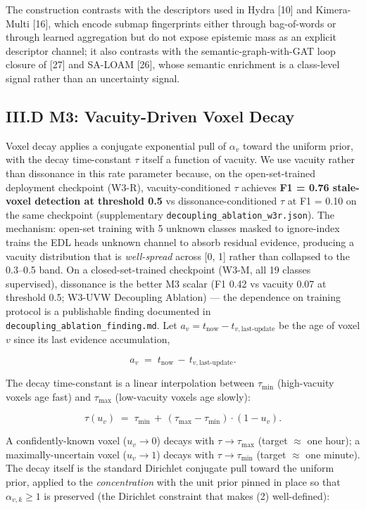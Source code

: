 \documentclass[
]{article}
\begin{document}
The construction contrasts with the descriptors used in Hydra {[}10{]}
and Kimera-Multi {[}16{]}, which encode submap fingerprints either
through bag-of-words or through learned aggregation but do not expose
epistemic mass as an explicit descriptor channel; it also contrasts with
the semantic-graph-with-GAT loop closure of {[}27{]} and SA-LOAM
{[}26{]}, whose semantic enrichment is a class-level signal rather than
an uncertainty signal.

\subsection{III.D M3: Vacuity-Driven Voxel
Decay}\label{iiid-m3-vacuity-driven-voxel-decay}

Voxel decay applies a conjugate exponential pull of \(\alpha_v\) toward
the uniform prior, with the decay time-constant \(\tau\) itself a
function of vacuity. We use vacuity rather than dissonance in this rate
parameter because, on the open-set-trained deployment checkpoint (W3-R),
vacuity-conditioned \(\tau\) achieves \textbf{F1 = 0.76 stale-voxel
detection at threshold 0.5} vs dissonance-conditioned \(\tau\) at F1 =
0.10 on the same checkpoint (supplementary
\texttt{decoupling\_ablation\_w3r.json}). The mechanism: open-set
training with 5 unknown classes masked to ignore-index trains the EDL
head\textquotesingle s unknown channel to absorb residual evidence,
producing a vacuity distribution that is \emph{well-spread} across {[}0,
1{]} rather than collapsed to the 0.3--0.5 band. On a closed-set-trained
checkpoint (W3-M, all 19 classes supervised), dissonance is the better
M3 scalar (F1 0.42 vs vacuity 0.07 at threshold 0.5; W3-UVW Decoupling
Ablation) --- the dependence on training protocol is a publishable
finding documented in \texttt{decoupling\_ablation\_finding.md}. Let
\(a_v = t_{\text{now}} - t_{v,\text{last-update}}\) be the age of voxel
\(v\) since its last evidence accumulation,

\[
a_v \;=\; t_{\text{now}} \,-\, t_{v,\text{last-update}} . \tag{10}
\]

The decay time-constant is a linear interpolation between
\(\tau_{\min}\) (high-vacuity voxels age fast) and \(\tau_{\max}\)
(low-vacuity voxels age slowly):

\[
\tau(u_v) \;=\; \tau_{\min} \,+\, (\tau_{\max} - \tau_{\min}) \cdot (1 - u_v) . \tag{11}
\]

A confidently-known voxel (\(u_v \to 0\)) decays with
\(\tau \to \tau_{\max}\) (target \(\approx\) one hour); a
maximally-uncertain voxel (\(u_v \to 1\)) decays with
\(\tau \to \tau_{\min}\) (target \(\approx\) one minute). The decay
itself is the standard Dirichlet conjugate pull toward the uniform
prior, applied to the \emph{concentration} with the unit prior pinned in
place so that \(\alpha_{v,k} \ge 1\) is preserved (the Dirichlet
constraint that makes (2) well-defined):
\end{document}
